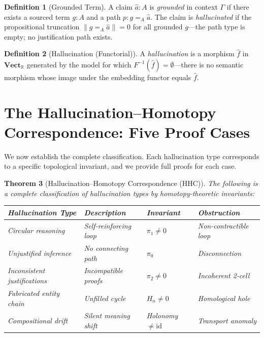 \documentclass[11pt,a4paper]{article}
\theoremstyle{plain}
\newtheorem{theorem}{Theorem}[section]
\theoremstyle{definition}
\newtheorem{definition}[theorem]{Definition}
\theoremstyle{remark}
\newcommand{\Vect}{\mathbf{Vect}}
\newcommand{\id}{\mathrm{id}}
\newcommand{\R}{\mathbb{R}}
\begin{document}
\begin{definition}[Grounded Term]
\label{def:grounded}
A claim $\hat{a} : A$ is \emph{grounded} in context $\Gamma$ if there exists a sourced term $g : A$ and a path $p : g =_A \hat{a}$. The claim is \emph{hallucinated} if the propositional truncation $\|g =_A \hat{a}\| = 0$ for all grounded $g$---the path type is empty; no justification path exists.
\end{definition}

\begin{definition}[Hallucination (Functorial)]
\label{def:hallucination-functorial}
A \emph{hallucination} is a morphism $\hat{f}$ in $\Vect_{\R}$ generated by the model for which $F^{-1}(\hat{f}) = \emptyset$---there is no semantic morphism whose image under the embedding functor equals $\hat{f}$.
\end{definition}


\section{The Hallucination--Homotopy Correspondence: Five Proof Cases}
\label{sec:five-cases}

We now establish the complete classification. Each hallucination type corresponds to a specific topological invariant, and we provide full proofs for each case.

\begin{theorem}[Hallucination--Homotopy Correspondence (HHC)]
\label{thm:hhc}
The following is a complete classification of hallucination types by homotopy-theoretic invariants:

\begin{center}
\begin{tabular}{@{}llll@{}}
\toprule
\textbf{Hallucination Type} & \textbf{Description} & \textbf{Invariant} & \textbf{Obstruction} \\
\midrule
Circular reasoning & Self-reinforcing loop & $\pi_1 \neq 0$ & Non-contractible loop \\
Unjustified inference & No connecting path & $\pi_0$ & Disconnection \\
Inconsistent justifications & Incompatible proofs & $\pi_2 \neq 0$ & Incoherent 2-cell \\
Fabricated entity chain & Unfilled cycle & $H_n \neq 0$ & Homological hole \\
Compositional drift & Silent meaning shift & Holonomy $\neq \id$ & Transport anomaly \\
\bottomrule
\end{tabular}
\end{center}
\end{theorem}
\end{document}
